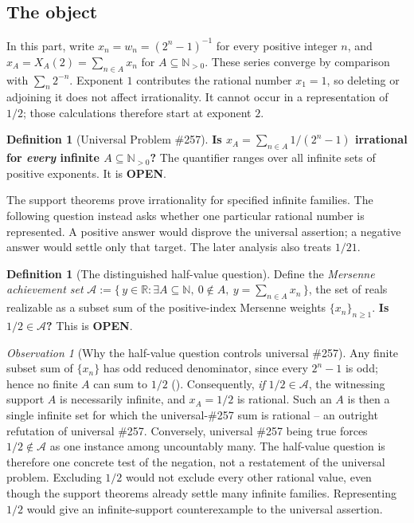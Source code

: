 \documentclass[11pt]{article}
\theoremstyle{plain}
\theoremstyle{definition}
\newtheorem{defn}[thm]{Definition}
\theoremstyle{remark}
\newtheorem{obs}[thm]{Observation}
\newcommand{\lean}[2]{\leanlink{#2}}
\begin{document}
\subsection{The object}

In this part, write $x_n=w_n=(2^n-1)^{-1}$ for every positive
integer $n$, and $x_A=X_A(2)=\sum_{n\in A}x_n$ for
$A\subseteq\mathbb N_{>0}$.  These series converge by comparison
with $\sum_n2^{-n}$.  Exponent $1$ contributes the rational number
$x_1=1$, so deleting or adjoining it does not affect irrationality.
It cannot occur in a representation of $1/2$; those calculations
therefore start at exponent $2$.

\begin{defn}[Universal Problem \#257]
\textbf{Is $x_A = \sum_{n \in A} 1/(2^n-1)$ irrational for \emph{every} infinite
$A \subseteq \mathbb{N}_{>0}$?}
The quantifier ranges over all infinite sets of positive exponents. It is
\textbf{OPEN}.
\end{defn}

The support theorems prove irrationality for specified infinite
families.  The following question instead asks whether one particular
rational number is represented.  A positive answer would disprove
the universal assertion; a negative answer would settle only that
target.  The later analysis also treats $1/21$.

\begin{defn}[The distinguished half-value question]
\label{defn:half-question}
Define the \emph{Mersenne achievement set}
$\mathcal{A} := \{\,y \in \mathbb{R} : \exists A \subseteq \mathbb{N},\ 0 \notin A,\ y =
\sum_{n \in A} x_n\,\}$, the set of reals realizable as a subset sum of the positive-index Mersenne
weights $\{x_n\}_{n \ge 1}$. \textbf{Is $1/2 \in \mathcal{A}$?} This is \textbf{OPEN}.
\end{defn}

\begin{obs}[Why the half-value question controls universal \#257]
\label{obs:half-controls-universal}
Any finite subset sum of $\{x_n\}$ has odd reduced denominator, since every $2^n - 1$ is odd; hence
no finite $A$ can sum to $1/2$ (\lean{positiveMersenneSupportValue_coe_finset_ne_half}{HalfCutLocator.lean:243}).
Consequently, \emph{if} $1/2 \in \mathcal{A}$, the witnessing support $A$ is necessarily infinite, and
$x_A = 1/2$ is rational. Such an $A$ is then a single infinite set for which the universal-\#257
sum is rational -- an outright refutation of universal \#257. Conversely, universal \#257 being true
forces $1/2 \notin \mathcal{A}$ as one instance among uncountably many. The half-value question is therefore one concrete test of the negation,
not a restatement of the universal problem.  Excluding $1/2$ would
not exclude every other rational value, even though the support
theorems already settle many infinite families.  Representing $1/2$
would give an infinite-support counterexample to the universal
assertion.
\end{obs}
\end{document}
